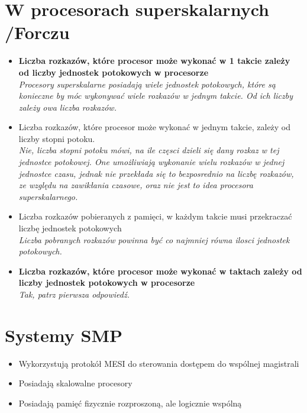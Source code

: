 \documentclass[a4paper,twoside]{article}
\begin{document}
\section{W procesorach superskalarnych {\small /Forczu}}
	\begin{itemize}
    \item \textbf{Liczba rozkazów, które procesor może wykonać w 1 takcie zależy od liczby jednostek potokowych w procesorze}\\
    {\small \emph{Procesory superskalarne posiadają wiele jednostek potokowych, które są konieczne by móc wykonywać wiele rozkazów w jednym takcie. Od ich liczby zależy owa liczba rozkazów.}}
    \item Liczba rozkazów, które procesor może wykonać w jednym takcie, zależy od liczby stopni potoku.\\
    {\small \emph{Nie, liczba stopni potoku mówi, na ile częsci dzieli się dany rozkaz w tej jednostce potokowej. One umożliwiają wykonanie wielu rozkazów w jednej jednostce czasu, jednak nie przekłada się to bezposrednio na liczbę rozkazów, ze względu na zawikłania czasowe, oraz nie jest to idea procesora superskalarnego.}}
    \item Liczba rozkazów pobieranych z pamięci, w każdym takcie musi przekraczać liczbę jednostek potokowych\\
    {\small \emph{Liczba pobranych rozkazów powinna być co najmniej równa ilosci jednostek potokowych.}}
    \item \textbf{Liczba rozkazów, które procesor może wykonać w taktach zależy od liczby jednostek potokowych w procesorze}\\
    {\small \emph{Tak, patrz pierwsza odpowiedź.}}
    \end{itemize}

\section{Systemy SMP}
	\begin{itemize}
    \item Wykorzystują protokół MESI do sterowania dostępem do wspólnej magistrali
    \item Posiadają skalowalne procesory
    \item Posiadają pamięć fizycznie rozproszoną, ale logicznie wspólną
    \end{itemize}
\end{document}
